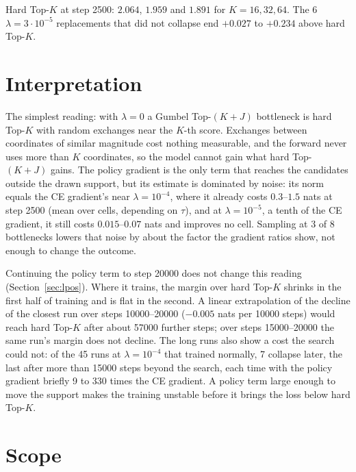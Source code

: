 \documentclass[11pt,a4paper]{article}
\begin{document}
Hard Top-$K$ at step 2500: $2.064$, $1.959$ and $1.891$ for $K = 16, 32, 64$. The
6 $\lambda = 3\cdot10^{-5}$ replacements that did not collapse end $+0.027$ to
$+0.234$ above hard Top-$K$.

\section{Interpretation}

The simplest reading: with $\lambda = 0$ a Gumbel Top-$(K{+}J)$ bottleneck is
hard Top-$K$ with random exchanges near the $K$-th score. Exchanges between
coordinates of similar magnitude cost nothing measurable, and the forward never
uses more than $K$ coordinates, so the model cannot gain what hard Top-$(K{+}J)$
gains. The policy gradient is the only term that reaches the candidates outside
the drawn support, but its estimate is dominated by noise: its norm equals
the CE gradient's near $\lambda = 10^{-4}$, where it already costs $0.3$--$1.5$
nats at step 2500 (mean over cells, depending on $\tau$), and at
$\lambda = 10^{-5}$, a tenth of the CE gradient, it still costs
$0.015$--$0.07$ nats and improves no cell. Sampling at 3
of 8 bottlenecks lowers that noise by about the factor the gradient ratios show,
not enough to change the outcome.

Continuing the policy term to step 20000 does not change this reading
(Section~\ref{sec:lpos}). Where it trains, the margin over hard Top-$K$ shrinks in
the first half of training and is flat in the second. A linear extrapolation of
the decline of the closest run over steps 10000--20000 ($-0.005$ nats per 10000
steps) would reach hard Top-$K$ after about 57000 further steps; over steps
15000--20000 the same run's margin does not decline. The long runs also show a
cost the search could not: of the 45 runs at $\lambda = 10^{-4}$ that trained
normally, 7 collapse later, the last after more than 15000 steps beyond the
search, each time with the policy gradient briefly 9 to 330 times the CE
gradient. A policy term large enough to move the support makes the training
unstable before it brings the loss below hard Top-$K$.

\section{Scope}
\end{document}
